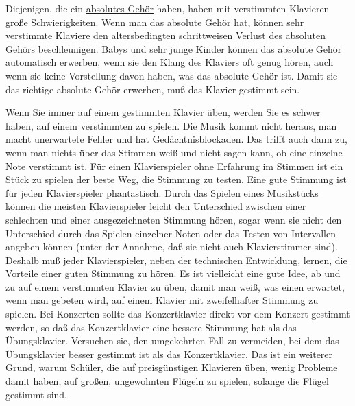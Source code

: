 Diejenigen, die ein \hyperref[c1iii12]{absolutes Gehör} haben, haben mit verstimmten Klavieren große Schwierigkeiten.
Wenn man das absolute Gehör hat, können sehr verstimmte Klaviere den altersbedingten schrittweisen Verlust des absoluten Gehörs beschleunigen.
Babys und sehr junge Kinder können das absolute Gehör automatisch erwerben, wenn sie den Klang des Klaviers oft genug hören, auch wenn sie keine Vorstellung davon haben, was das absolute Gehör ist.
Damit sie das richtige absolute Gehör erwerben, muß das Klavier gestimmt sein.

Wenn Sie immer auf einem gestimmten Klavier üben, werden Sie es schwer haben, auf einem verstimmten zu spielen.
Die Musik kommt nicht heraus, man macht unerwartete Fehler und hat Gedächtnisblockaden.
Das trifft auch dann zu, wenn man nichts über das Stimmen weiß und nicht sagen kann, ob eine einzelne Note verstimmt ist.
Für einen Klavierspieler ohne Erfahrung im Stimmen ist ein Stück zu spielen der beste Weg, die Stimmung zu testen.
Eine gute Stimmung ist für jeden Klavierspieler phantastisch.
Durch das Spielen eines Musikstücks können die meisten Klavierspieler leicht den Unterschied zwischen einer schlechten und einer ausgezeichneten Stimmung hören, sogar wenn sie nicht den Unterschied durch das Spielen einzelner Noten oder das Testen von Intervallen angeben können (unter der Annahme, daß sie nicht auch Klavierstimmer sind).
Deshalb muß jeder Klavierspieler, neben der technischen Entwicklung, lernen, die Vorteile einer guten Stimmung zu hören.
Es ist vielleicht eine gute Idee, ab und zu auf einem verstimmten Klavier zu üben, damit man weiß, was einen erwartet, wenn man gebeten wird, auf einem Klavier mit zweifelhafter Stimmung zu spielen.
Bei Konzerten sollte das Konzertklavier direkt vor dem Konzert gestimmt werden, so daß das Konzertklavier eine bessere Stimmung hat als das Übungsklavier.
Versuchen sie, den umgekehrten Fall zu vermeiden, bei dem das Übungsklavier besser gestimmt ist als das Konzertklavier.
Das ist ein weiterer Grund, warum Schüler, die auf preisgünstigen Klavieren üben, wenig Probleme damit haben, auf großen, ungewohnten Flügeln zu spielen, solange die Flügel gestimmt sind.

